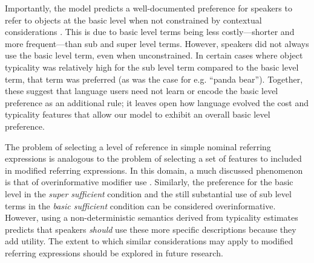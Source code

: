 \documentclass[10pt,letterpaper]{article}
\newcommand{\jd}[1]{\textcolor{Blue}{[jd: #1]}}
\begin{document}


Importantly, the model predicts a well-documented preference for speakers  to refer to objects at the basic level when not constrained by contextual considerations  \cite{RoschEtAl76_BasicLevel}. This is due to basic level terms being less costly---shorter and more frequent---than sub and super level terms. However, speakers did not always use the basic level term, even when unconstrained. In certain cases where object typicality was relatively high for the sub level term compared to the basic level term, that term was preferred (as was the case for e.g. ``panda bear''). %
Together, these suggest that language users need not learn or encode the basic level preference as an additional rule; it leaves open how language evolved the cost and typicality features that allow our model to exhibit an overall basic level preference.

The problem of selecting a level of reference in simple nominal referring expressions is analogous to the problem of selecting a set of features to included in modified referring expressions. In this domain, a much discussed phenomenon is that of overinformative modifier use \cite{Gatt2014}. Similarly, the preference for the basic level in the \emph{super sufficient} condition and the still substantial use of sub level terms in the \emph{basic sufficient} condition can be considered overinformative. However, using a non-deterministic semantics derived from typicality estimates predicts that speakers \emph{should} use these more specific descriptions because they add utility. The extent to which similar considerations may apply to modified referring expressions should be explored in future research.

\end{document}

